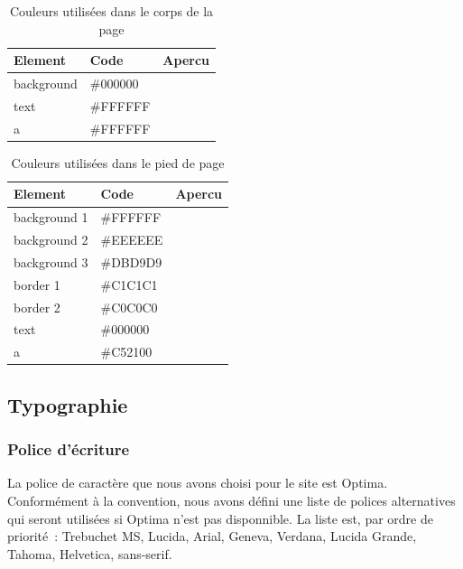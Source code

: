 \documentclass[letter, 11pt]{report}
\begin{document}
\begin{table}[h!tpb]
	\caption{Couleurs utilisées dans le corps de la page}
	\begin{center}
		\begin{tabular}{|l|l|l|}
			\hline
			Element    & Code     & Apercu \\
			\hline
			background & \#000000 & \cellcolor[HTML]{000000} \\ \hline
			text       & \#FFFFFF & \cellcolor[HTML]{FFFFFF} \\ \hline
			a          & \#FFFFFF & \cellcolor[HTML]{FFFFFF} \\ \hline
		\end{tabular}
	\end{center}
\end{table}

\begin{table}[h!tpb]
	\caption{Couleurs utilisées dans le pied de page}
	\begin{center}
		\begin{tabular}{|l|l|l|}
			\hline
			Element      & Code     & Apercu \\
			\hline
			background 1 & \#FFFFFF & \cellcolor[HTML]{FFFFFF} \\ \hline
			background 2 & \#EEEEEE & \cellcolor[HTML]{EEEEEE} \\ \hline
			background 3 & \#DBD9D9 & \cellcolor[HTML]{DBD9D9} \\ \hline
			border 1     & \#C1C1C1 & \cellcolor[HTML]{C1C1C1} \\ \hline
			border 2     & \#C0C0C0 & \cellcolor[HTML]{C0C0C0} \\ \hline
			text         & \#000000 & \cellcolor[HTML]{000000} \\ \hline
			a            & \#C52100 & \cellcolor[HTML]{C52100} \\ \hline
		\end{tabular}
	\end{center}
\end{table}

\subsection{Typographie}

\subsubsection{Police d’écriture}

La police de caractère que nous avons choisi pour le site est Optima. Conformément à la convention, nous avons défini une liste de polices alternatives qui seront utilisées si Optima n'est pas disponnible. La liste est, par ordre de priorité~: Trebuchet MS, Lucida, Arial, Geneva, Verdana, Lucida Grande, Tahoma, Helvetica, sans-serif.
\end{document}

